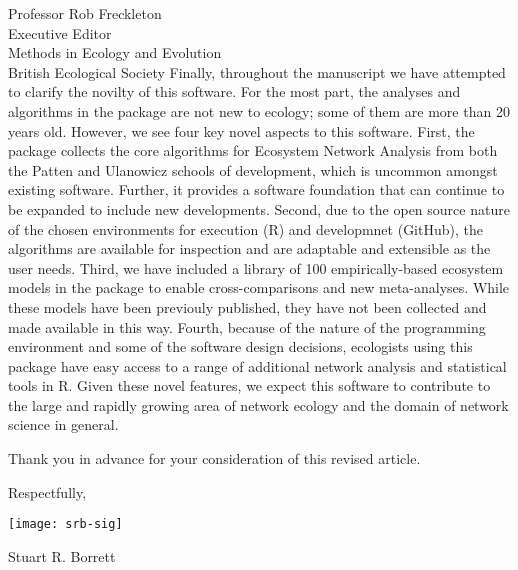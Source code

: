 \documentclass[letter]{letter}
\newcommand{\R}{R}
\begin{document}
\begin{letter}{Professor Rob Freckleton\\
Executive Editor\\
Methods in Ecology and Evolution\\
British Ecological Society
}
Finally, throughout the manuscript we have attempted to clarify the
novilty of this software.  For the most part, the analyses and
algorithms in the package are not new to ecology; some of them are
more than 20 years old.  However, we see four key novel aspects to
this software.  First, the package collects the core algorithms for
Ecosystem Network Analysis from both the Patten and Ulanowicz schools
of development, which is uncommon amongst existing software.  Further,
it provides a software foundation that can continue to be expanded to
include new developments.  Second, due to the open source nature of
the chosen environments for execution (\R ) and developmnet (GitHub),
the algorithms are available for inspection and are adaptable and
extensible as the user needs.  Third, we have included a library of
100 empirically-based ecosystem models in the package to enable
cross-comparisons and new meta-analyses.  While these models have been
previouly published, they have not been collected and made available
in this way.  Fourth, because of the nature of the programming
environment and some of the software design decisions,
ecologists using this package have easy access to a range of
additional network analysis and statistical tools in \R .  Given these
novel features, we expect this software to contribute to the large and
rapidly growing area of network ecology and the domain of network
science in general.

Thank you in advance for your consideration of this revised article.

Respectfully,

\texttt{[image: srb-sig]}

Stuart R. Borrett
\end{letter}
\end{document}
